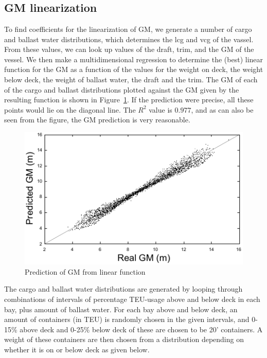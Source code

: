 \section{}\label{sec:implementation}
\subsection{GM linearization}
To find coefficients for the linearization of GM, we generate a number of cargo and ballast water distributions, which determines the lcg and vcg of the vassel. From these values, we can look up values of the draft, trim, and the GM of the vessel. %
We then make a multidimensional regression to determine the (best) linear function for the GM as a function of the values for the weight on deck, the weight below deck, the weight of ballast water, the draft and the trim. The GM of each of the cargo and ballast distributions plotted against the GM given by the resulting function is shown in Figure~\ref{fig:predictGM}. If the prediction were precise, all these points would lie on the diagonal line. The $R^2$ value is $0.977$, and as can also be seen from the figure, the GM prediction is very reasonable.

\begin{figure}
	\centering
		\includegraphics[scale=1.2]{figures/gnuPlotAll.pdf}
	\caption{Prediction of GM from linear function}
	\label{fig:predictGM}
\end{figure}

The cargo and ballast water distributions are generated by looping through combinations of intervals of percentage TEU-usage above and below deck in each bay, plus amount of ballast water. For each bay above and below deck, an amount of containers (in TEU) is randomly chosen in the given intervals, and 0-15\% above deck and 0-25\% below deck of these are chosen to be 20' containers. A weight of these containers are then chosen from a distribution depending on whether it is on or below deck as given below.

